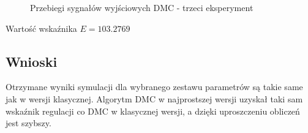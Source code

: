\ifdefined\CompileFigures
    \begin{figure}[H] 
            \centering
            
            \caption{Przebiegi sygnałów wyjściowych DMC - trzeci eksperyment}
            \label{projekt:zad6:figure:projzadanie6DMCBESTy}
    \end{figure}
\fi

Wartość wskaźnika $E=\num{103.2769}$

\subsection{Wnioski}

Otrzymane wyniki symulacji dla wybranego zestawu parametrów są takie same jak w
wersji klasycznej.
\newline
Algorytm DMC w najprostszej wersji uzyskał taki sam wskaźnik regulacji co
DMC w klasycznej wersji, a dzięki uproszczeniu obliczeń jest szybszy.


\newpage
